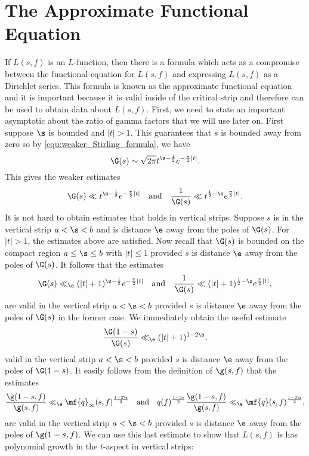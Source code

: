   \section{The Approximate Functional Equation}
    If $L(s,f)$ is an $L$-function, then there is a formula which acts as a compromise between the functional equation for $L(s,f)$ and expressing $L(s,f)$ as a Dirichlet series. This formula is known as the approximate functional equation and it is important because it is valid inside of the critical strip and therefore can be used to obtain data about $L(s,f)$. First, we need to state an important asymptotic about the ratio of gamma factors that we will use later on. First suppose $\s$ is bounded and $|t| > 1$. This guarantees that $s$ is bounded away from zero so by \cref{equ:weaker_Stirling_formula}, we have
    \[
      \G(s) \sim \sqrt{2\pi}t^{\s-\frac{1}{2}}e^{-\frac{\pi}{2}|t|}.
    \]
    This gives the weaker estimates
    \[
      \G(s) \ll t^{\s-\frac{1}{2}}e^{-\frac{\pi}{2}|t|} \quad \text{and} \quad \frac{1}{\G(s)} \ll t^{\frac{1}{2}-\s}e^{\frac{\pi}{2}|t|}.
    \]
    It is not hard to obtain estimates that holds in vertical strips. Suppose $s$ is in the vertical strip $a < \s < b$ and is distance $\e$ away from the poles of $\G(s)$. For $|t| > 1$, the estimates above are satisfied. Now recall that $\G(s)$ is bounded on the compact region $a \le \s \le b$ with $|t| \le 1$ provided $s$ is distance $\e$ away from the poles of $\G(s)$. It follows that the estimates
    \begin{equation}\label{equ:modified_gamma_estimates}
      \G(s) \ll_{\e} (|t|+1)^{\s-\frac{1}{2}}e^{-\frac{\pi}{2}|t|} \quad \text{and} \quad \frac{1}{\G(s)} \ll (|t|+1)^{\frac{1}{2}-\s}e^{\frac{\pi}{2}|t|},
    \end{equation}
    are valid in the vertical strip $a < \s < b$ provided $s$ is distance $\e$ away from the poles of $\G(s)$ in the former case. We immediately obtain the useful estimate
    \[
      \frac{\G(1-s)}{\G(s)} \ll_{\e} (|t|+1)^{1-2\s},
    \]
    valid in the vertical strip $a < \s < b$ provided $s$ is distance $\e$ away from the poles of $\G(1-s)$. It easily follows from the definition of $\g(s,f)$ that the estimates
    \begin{equation}\label{equ:gamma_factor_analytic_conductor_estimate}
      \frac{\g(1-s,f)}{\g(s,f)} \ll_{\e} \mf{q}_{\infty}(s,f)^{\frac{1-2\s}{2}} \quad \text{and} \quad q(f)^{\frac{1-2s}{2}}\frac{\g(1-s,f)}{\g(s,f)} \ll_{\e} \mf{q}(s,f)^{\frac{1-2\s}{2}},
    \end{equation}
    are valid in the vertical strip $a < \s < b$ provided $s$ is distance $\e$ away from the poles of $\g(1-s,f)$. We can use this last estimate to show that $L(s,f)$ is has polynomial growth in the $t$-aspect in vertical strips:

